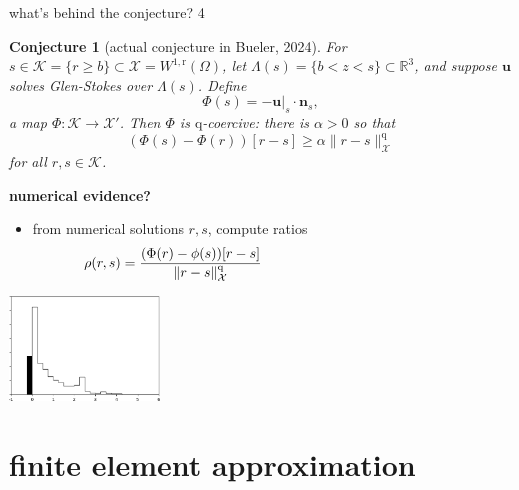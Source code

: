 \documentclass[10pt,dvipsnames]{beamer}
\newtheorem*{conjecture}{Conjecture}
\newcommand{\bn}{\mathbf{n}}
\newcommand{\bu}{\mathbf{u}}
\newcommand{\cK}{\mathcal{K}}
\newcommand{\cX}{\mathcal{X}}
\newcommand{\RR}{\mathbb{R}}
\newcommand{\qq}{\mathrm{q}}
\newcommand{\rr}{\mathrm{r}}
\begin{document}
\begin{frame}{what's behind the conjecture? 4}

\bigskip
\begin{conjecture}[actual conjecture in Bueler, 2024]
For $s \in \cK = \{r \ge b\} \subset \cX = W^{1,\rr}(\Omega)$, let $\Lambda(s) = \{b<z<s\} \subset \RR^3$, and suppose $\bu$ solves Glen-Stokes over $\Lambda(s)$.  Define
	$$\Phi(s) = - \bu|_s \cdot \bn_s,$$
a map $\Phi:\cK \to \cX'$.  Then $\Phi$ is $\qq$-coercive: there is $\alpha>0$ so that
	$$\left(\Phi(s) - \Phi(r)\right)[r-s] \ge \alpha \|r-s\|_\cX^\qq$$
for all $r,s\in\cK$.
\end{conjecture}

\bigskip
\footnotesize
\noindent \textbf{numerical evidence?}

\begin{itemize}
\item from numerical solutions $r,s$, compute ratios
    $$\rho(r,s) = \frac{(\Phi(r)-\phi(s))[r-s]}{\|r-s\|_\cX^\qq} \hspace{50mm}$$
\end{itemize}

\vspace{-20mm}
\hfill \includegraphics[width=0.3\textwidth]{smoothratios} \qquad
\end{frame}


\section{finite element approximation}
\end{document}
